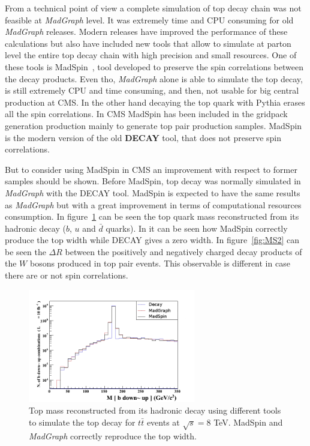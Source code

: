 From a technical point of view a complete simulation of top decay chain was not feasible at \textit{MadGraph} level. It was extremely time and CPU consuming for old \textit{MadGraph} releases. Modern releases have improved the performance of these calculations but also have included new tools that allow to simulate at parton level the entire top decay chain with high precision and small resources. One of these tools is MadSpin~\cite{Artoisenet:2012st, Frixione:2007zp}, tool developed to preserve the spin correlations between the decay products. Even tho, \textit{MadGraph} alone is able to simulate the top decay, is still extremely CPU and time consuming, and then, not usable for big central production at CMS. In the other hand decaying the top quark with Pythia erases all the spin correlations. In CMS MadSpin has been included in the gridpack generation production mainly to generate top pair production samples. MadSpin is the modern version of the old \textbf{DECAY} tool, that does not preserve spin correlations.

But to consider using MadSpin in CMS an improvement with respect to former samples should be shown. Before MadSpin, top decay was normally simulated in \textit{MadGraph} with the DECAY tool. MadSpin is expected to have the same results as \textit{MadGraph} but with a great improvement in terms of computational resources consumption. In figure~\ref{fig:MS1} can be seen the top quark mass reconstructed from its hadronic decay ($b$, $u$ and $\bar{d}$ quarks). In it can be seen how MadSpin correctly produce the top width while DECAY gives a zero width. In figure~\ref{fig:MS2} can be seen the $\Delta R$ between the positively and negatively charged decay products of the $W$ bosons produced in top pair events. This observable is different in case there are or not spin correlations. 

\begin{figure}[!Hhtbp]
  \begin{center}
    \includegraphics[width=0.65\textwidth]{figs/TT_MadSPin_1.png}
    \caption{Top mass reconstructed from its hadronic decay using different tools to simulate the top decay for $t\bar{t}$ events at $\sqrt{s}=8$ TeV. MadSpin and \textit{MadGraph} correctly reproduce the top width.}
    \label{fig:MS1}
  \end{center}
\end{figure}

